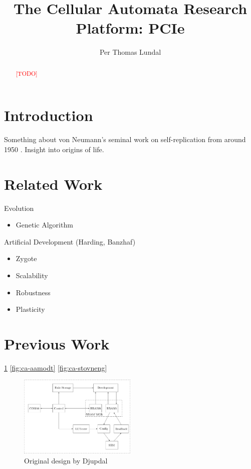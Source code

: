 \documentclass[a4paper]{IEEEtran}
\title{The Cellular Automata Research Platform: PCIe}
\author{Per Thomas Lundal}
\newcommand\TODO{\textcolor{red}{[TODO]}}
\begin{document}
\maketitle

\begin{abstract}

\TODO

\end{abstract}

\section{Introduction}

Something about von Neumann's seminal work on self-replication from around 1950 \cite{neumann1966theory}.
Insight into origins of life.


\section{Related Work}

Evolution
\begin{itemize}
    \item Genetic Algorithm
\end{itemize}

Artificial Development (Harding, Banzhaf)
\begin{itemize}
    \item Zygote
    \item Scalability
    \item Robustness
    \item Plasticity
\end{itemize}

\section{Previous Work}

\ref{fig:ca-djupdal}
\ref{fig:ca-aamodt}
\ref{fig:ca-stovneng}

\begin{figure}[h!]
    \centering
    \includegraphics[width=0.5\textwidth]{figures/ca-djupdal}
    \caption{Original design by Djupdal}
    \label{fig:ca-djupdal}
\end{figure}
\end{document}
